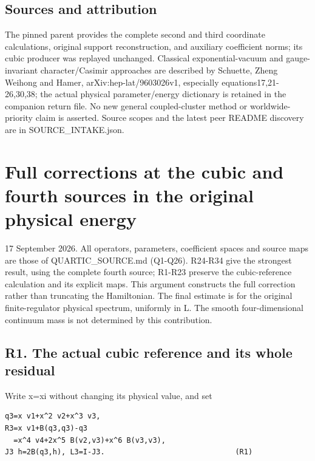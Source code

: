 \documentclass[11pt,a4paper]{article}
\let\originalsection\section
\renewcommand{\section}{\clearpage\originalsection}
\renewcommand{\[}{\begingroup\small\originaldisplaystart}
\renewcommand{\]}{\originaldisplayend\endgroup}
\begin{document}
\subsection{Sources and attribution}\label{sources-and-attribution}

The pinned parent provides the complete second and third coordinate
calculations, original support reconstruction, and auxiliary coefficient
norms; its cubic producer was replayed unchanged. Classical
exponential-vacuum and gauge-invariant character/Casimir approaches are
described by Schuette, Zheng Weihong and Hamer, arXiv:hep-lat/9603026v1,
especially equations17,21-26,30,38; the actual physical parameter/energy
dictionary is retained in the companion return file. No new general
coupled-cluster method or worldwide-priority claim is asserted. Source
scopes and the latest peer README discovery are in SOURCE\_INTAKE.json.

\section{Full corrections at the cubic and fourth sources in the
original physical
energy}\label{full-corrections-at-the-cubic-and-fourth-sources-in-the-original-physical-energy}

17 September 2026. All operators, parameters, coefficient spaces and
source maps are those of
{\ttfamily Q\allowbreak{}U\allowbreak{}A\allowbreak{}R\allowbreak{}T\allowbreak{}I\allowbreak{}C\allowbreak{}\_\allowbreak{}S\allowbreak{}O\allowbreak{}U\allowbreak{}R\allowbreak{}C\allowbreak{}E\allowbreak{}.\allowbreak{}m\allowbreak{}d\allowbreak{}}
(Q1-Q26). R24-R34 give the strongest result, using the complete fourth
source; R1-R23 preserve the cubic-reference calculation and its explicit
maps. This argument constructs the full correction rather than
truncating the Hamiltonian. The final estimate is for the original
finite-regulator physical spectrum, uniformly in L. The smooth
four-dimensional continuum mass is not determined by this contribution.

\subsection{R1. The actual cubic reference and its whole
residual}\label{r1.-the-actual-cubic-reference-and-its-whole-residual}

Write x=xi without changing its physical value, and set

\begin{verbatim}
q3=x v1+x^2 v2+x^3 v3,
R3=x v1+B(q3,q3)-q3
  =x^4 v4+2x^5 B(v2,v3)+x^6 B(v3,v3),
J3 h=2B(q3,h), L3=I-J3.                              (R1)
\end{verbatim}
\end{document}
